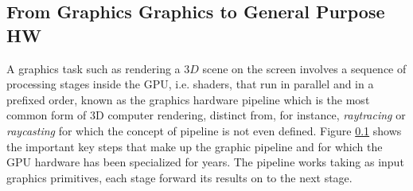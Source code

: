     \subsection{From Graphics Graphics to General Purpose HW}\label{graphicPipeline}
    A graphics task such as rendering a $3D$ scene on the screen
    involves a sequence of processing stages inside the GPU, i.e. shaders, that run in parallel and in a prefixed order, known as the graphics hardware
    pipeline which is the most common form of 3D computer rendering, distinct from, for instance, \textit{raytracing} or \textit{raycasting} for which the concept of pipeline is not even defined. Figure \ref{graphicPipeline} shows the important key steps that make up the graphic pipeline and for which the GPU hardware has been specialized for years. The pipeline works taking as input graphics primitives, each stage forward its results on to the next stage.
